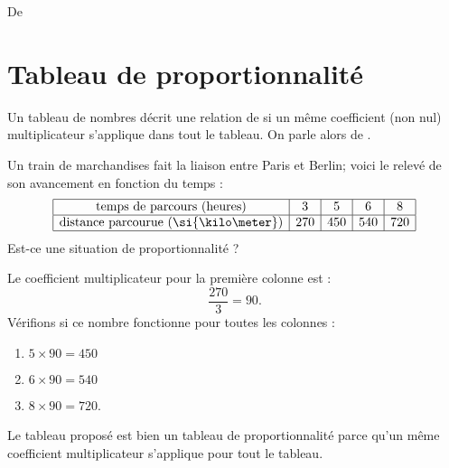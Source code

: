 

De \cite{NRHooXFvgpp5}

\section{Tableau de proportionnalité}

\begin{Aretenir}
    Un tableau de nombres décrit une relation de  si un même coefficient (non nul) multiplicateur s’applique dans tout le tableau. On parle alors de .
\end{Aretenir}

\begin{example}
    Un train de marchandises fait la liaison entre Paris et Berlin; voici le relevé de son avancement en fonction du temps :
    \begin{equation*}
        \begin{array}[]{|c|c|c|c|c|}
            \hline
            \text{temps de parcours (heures)}&3&5&6&8\\
            \hline
            \text{distance parcourue (\si{\kilo\meter})}&270&450&540&720\\
            \hline
        \end{array}
    \end{equation*}
    Est-ce une situation de proportionnalité ?

    Le coefficient multiplicateur pour la première colonne est :
    \begin{equation}
        \frac{ 270 }{ 3 }=90.
    \end{equation}
    Vérifions si ce nombre fonctionne pour toutes les colonnes :
    \begin{enumerate}
        \item
            \( 5\times 90=450\)
        \item
            \( 6\times 90=540\)
        \item
            \( 8\times 90=720\).
    \end{enumerate}
    Le tableau proposé est bien un tableau de proportionnalité parce qu'un même coefficient multiplicateur s'applique pour tout le tableau.
\end{example}

